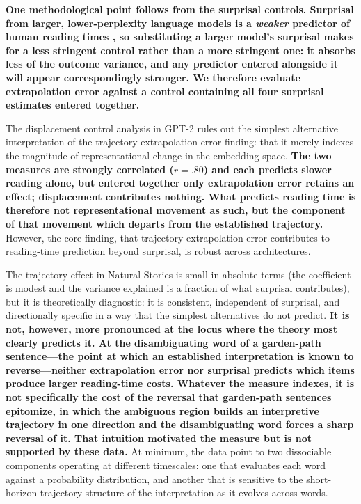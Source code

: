 \documentclass[12pt]{article}
\newcommand{\new}[1]{{\bfseries #1}}
\begin{document}
\new{One methodological point follows from the surprisal controls. Surprisal from larger, lower-perplexity language models is a \textit{weaker} predictor of human reading times \citep{oh2023b}, so substituting a larger model's surprisal makes for a less stringent control rather than a more stringent one: it absorbs less of the outcome variance, and any predictor entered alongside it will appear correspondingly stronger. We therefore evaluate extrapolation error against a control containing all four surprisal estimates entered together.}

The displacement control analysis in GPT-2 rules out the simplest alternative interpretation of the trajectory-extrapolation error finding: that it merely indexes the magnitude of representational change in the embedding space. \new{The two measures are strongly correlated ($r = .80$) and each predicts slower reading alone, but entered together only extrapolation error retains an effect; displacement contributes nothing. What predicts reading time is therefore not representational movement as such, but the component of that movement which departs from the established trajectory.} However, the core finding, that trajectory extrapolation error contributes to reading-time prediction beyond surprisal, is robust across architectures.

The trajectory effect in Natural Stories is small in absolute terms (the coefficient is modest and the variance explained is a fraction of what surprisal contributes), but it is theoretically diagnostic: it is consistent, independent of surprisal, and directionally specific in a way that the simplest alternatives do not predict. \new{It is not, however, more pronounced at the locus where the theory most clearly predicts it. At the disambiguating word of a garden-path sentence---the point at which an established interpretation is known to reverse---neither extrapolation error nor surprisal predicts which items produce larger reading-time costs. Whatever the measure indexes, it is not specifically the cost of the reversal that garden-path sentences epitomize, in which the ambiguous region builds an interpretive trajectory in one direction and the disambiguating word forces a sharp reversal of it. That intuition motivated the measure but is not supported by these data.} At minimum, the data point to two dissociable components operating at different timescales: one that evaluates each word against a probability distribution, and another that is sensitive to the short-horizon trajectory structure of the interpretation as it evolves across words.
\end{document}
